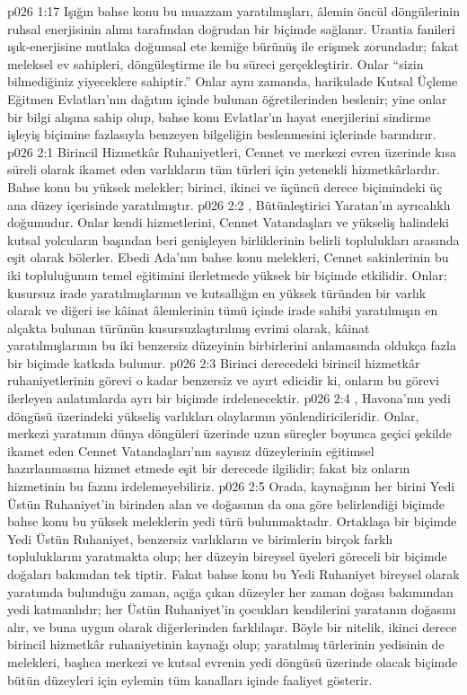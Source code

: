 \vs p026 1:17 Işığın bahse konu bu muazzam yaratılmışları, âlemin öncül döngülerinin ruhsal enerjisinin alımı tarafından doğrudan bir biçimde sağlanır. Urantia fanileri ışık\hyp{}enerjisine mutlaka doğumsal ete kemiğe bürünüş ile erişmek zorundadır; fakat meleksel ev sahipleri, döngüleştirme ile bu süreci gerçekleştirir. Onlar “sizin bilmediğiniz yiyeceklere sahiptir.” Onlar aynı zamanda, harikulade Kutsal Üçleme Eğitmen Evlatları’nın dağıtım içinde bulunan öğretilerinden beslenir; yine onlar bir bilgi alışına sahip olup, bahse konu Evlatlar’ın hayat enerjilerini sindirme işleyiş biçimine fazlasıyla benzeyen bilgeliğin beslenmesini içlerinde barındırır.
\vs p026 2:1 Birincil Hizmetkâr Ruhaniyetleri, Cennet ve merkezi evren üzerinde kısa süreli olarak ikamet eden varlıkların tüm türleri için yetenekli hizmetkârlardır. Bahse konu bu yüksek melekler; birinci, ikinci ve üçüncü derece biçimindeki üç ana düzey içerisinde yaratılmıştır.
\vs p026 2:2 , Bütünleştirici Yaratan’ın ayrıcalıklı doğumudur. Onlar kendi hizmetlerini, Cennet Vatandaşları ve yükseliş halindeki kutsal yolcuların başından beri genişleyen birliklerinin belirli toplulukları arasında eşit olarak bölerler. Ebedi Ada’nın bahse konu melekleri, Cennet sakinlerinin bu iki topluluğunun temel eğitimini ilerletmede yüksek bir biçimde etkilidir. Onlar; kusursuz irade yaratılmışlarının ve kutsallığın en yüksek türünden bir varlık olarak ve diğeri ise kâinat âlemlerinin tümü içinde irade sahibi yaratılmışın en alçakta bulunan türünün kusursuzlaştırılmış evrimi olarak, kâinat yaratılmışlarının bu iki benzersiz düzeyinin birbirlerini anlamasında oldukça fazla bir biçimde katkıda bulunur.
\vs p026 2:3 Birinci derecedeki birincil hizmetkâr ruhaniyetlerinin görevi o kadar benzersiz ve ayırt edicidir ki, onların bu görevi ilerleyen anlatımlarda ayrı bir biçimde irdelenecektir.
\vs p026 2:4 , Havona’nın yedi döngüsü üzerindeki yükseliş varlıkları olaylarının yönlendiricileridir. Onlar, merkezi yaratımın dünya döngüleri üzerinde uzun süreçler boyunca geçici şekilde ikamet eden Cennet Vatandaşları’nın sayısız düzeylerinin eğitimsel hazırlanmasına hizmet etmede eşit bir derecede ilgilidir; fakat biz onların hizmetinin bu fazını irdelemeyebiliriz.
\vs p026 2:5 Orada, kaynağının her birini Yedi Üstün Ruhaniyet’in birinden alan ve doğasının da ona göre belirlendiği biçimde bahse konu bu yüksek meleklerin yedi türü bulunmaktadır. Ortaklaşa bir biçimde Yedi Üstün Ruhaniyet, benzersiz varlıkların ve birimlerin birçok farklı topluluklarını yaratmakta olup; her düzeyin bireysel üyeleri göreceli bir biçimde doğaları bakımdan tek tiptir. Fakat bahse konu bu Yedi Ruhaniyet bireysel olarak yaratımda bulunduğu zaman, açığa çıkan düzeyler her zaman doğası bakımından yedi katmanlıdır; her Üstün Ruhaniyet’in çocukları kendilerini yaratanın doğasını alır, ve buna uygun olarak diğerlerinden farklılaşır. Böyle bir nitelik, ikinci derece birincil hizmetkâr ruhaniyetinin kaynağı olup; yaratılmış türlerinin yedisinin de melekleri, başlıca merkezi ve kutsal evrenin yedi döngüsü üzerinde olacak biçimde bütün düzeyleri için eylemin tüm kanalları içinde faaliyet gösterir.
